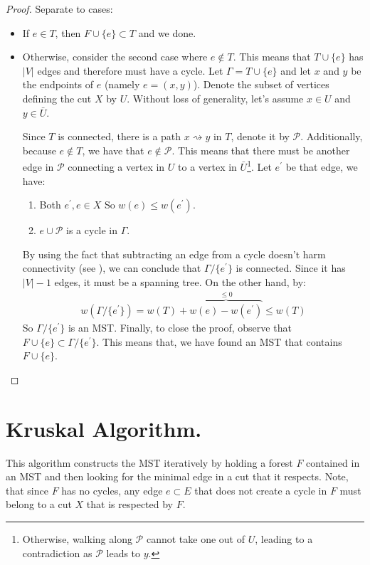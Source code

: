 \begin{proof} Separate to cases: 
  \begin{itemize}
    \item If $e \in T$, then $F \cup \{ e \} \subset T$ and we done.
    \item Otherwise, consider the second case where $e \notin T$. This means that $T \cup \{ e \}$ has $|V|$ edges and therefore must have a cycle. Let $\Gamma = T \cup \{ e \}$ and let $x$ and $y$ be the endpoints of $e$ (namely $e = (x,y)$). Denote the subset of vertices defining the cut $X$ by $U$. Without loss of generality, let's assume $x \in U$ and $y \in \bar{U}$.


Since $T$ is connected, there is a path $x \rightsquigarrow y$ in $T$, denote it by $\mathcal{P}$. Additionally, because $e \notin T$, we have that $e \notin \mathcal{P}$. This means that there must be another edge in $\mathcal{P}$ connecting a vertex in $U$ to a vertex in $\bar{U}$\footnote{Otherwise, walking along $\mathcal{P}$ cannot take one out of $U$, leading to a contradiction as $\mathcal{P}$ leads to $y$.}. Let $e^{\prime}$ be that edge, we have:\begin{enumerate}
    \item Both $e^{\prime}, e \in X$ So $w(e) \le w(e^{\prime})$.
    \item $e \cup \mathcal{P}$ is a cycle in $\Gamma$. 
  \end{enumerate}

By using the fact that subtracting an edge from a cycle doesn't harm connectivity (see ), we can conclude that $\Gamma/\{e^{\prime}\}$ is connected. Since it has $|V|-1$ edges, it must be a spanning tree. On the other hand, by:
  \begin{equation*}
    \begin{split}
      w\left( \Gamma/\{e^{\prime}\} \right) = w\left( T \right) + \overbrace{w(e) - w(e^{\prime})}^{ \le 0} \le w\left( T \right) 
    \end{split}
  \end{equation*}
  So $\Gamma/\{e^{\prime}\}$ is an MST.  Finally, to close the proof, observe that $F \cup \{e\} \subset \Gamma/\{e^{\prime}\}$. This means that, we have found an MST that contains $F \cup \{e\}$. 
  \end{itemize}

\end{proof}
\section{Kruskal Algorithm.} This algorithm constructs the MST iteratively by holding a forest $F$ contained in an MST and then looking for the minimal edge in a cut that it respects. Note, that since $F$ has no cycles, any edge $e \subset E$ that does not create a cycle in $F$ must belong to a cut $X$ that is respected by $F$.

